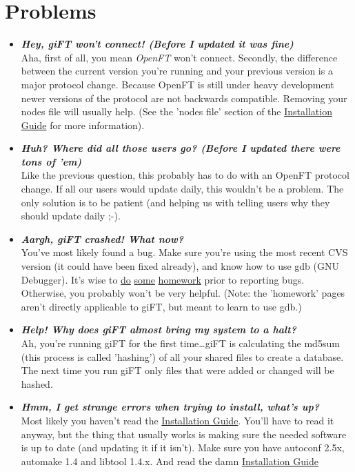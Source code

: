 \documentclass[10pt]{article}
\newcommand{\question}[1]{\item\textbf{\emph{#1}}}
\begin{document}
\section{Problems}
\begin{itemize}

\question {Hey, giFT won't connect! (Before I updated it was
fine)}\\
Aha, first of all, you mean \emph{OpenFT} won't connect.
Secondly, the difference between the current version you're
running and your previous version is a major protocol change.
Because OpenFT is still under heavy development newer versions of
the protocol are not backwards compatible.  Removing your nodes
file will usually help. (See the 'nodes file' section of the
\href{http://gift.sourceforge.net/docs.php?document=install.html}{Installation
Guide} for more information).

\question {Huh? Where did all those users go? (Before I updated
there were tons of 'em)}\\
Like the previous question, this probably has to do with an OpenFT
protocol change.  If all our users would update daily, this
wouldn't be a problem.  The only solution is to be patient (and
helping us with telling users why they should update daily ;-).

\question {Aargh, giFT crashed! What now?}\\
You've most likely found a bug. Make sure you're using the most
recent CVS version (it could have been fixed already), and know
how to use gdb (GNU Debugger). It's wise to
\href{http://wand.cs.waikato.ac.nz/~dhtrl1/pl5/gdb.html}{do}
\href{http://web.mit.edu/sipb-iap/unixsoftdev/www/gdb.html}{some}
\href{http://users.actcom.co.il/~choo/lupg/tutorials/debugging/debugging-with-gdb.html}{homework}
prior to reporting bugs. Otherwise, you probably won't be very
helpful. (Note: the 'homework' pages aren't directly applicable to
giFT, but meant to learn to use gdb.)

\question {Help! Why does giFT almost bring my system to a
halt?}\\
Ah, you're running giFT for the first time\ldots  giFT is
calculating the md5sum (this process is called 'hashing') of all
your shared files to create a database. The next time you run giFT
only files that were added or changed will be hashed.

\question {Hmm, I get strange errors when trying to install,
what's up?}\\
Most likely you haven't read the
\href{http://gift.sourceforge.net/docs.php?document=install.html}{Installation
Guide}. You'll have to read it anyway, but the thing that usually works is
making sure the needed software is up to date (and updating it if
it isn't). Make sure you have autoconf 2.5x, automake 1.4 and
libtool 1.4.x. And read the damn
\href{http://gift.sourceforge.net/docs.php?document=install.html}{Installation
Guide}

\end{itemize}
\end{document}
